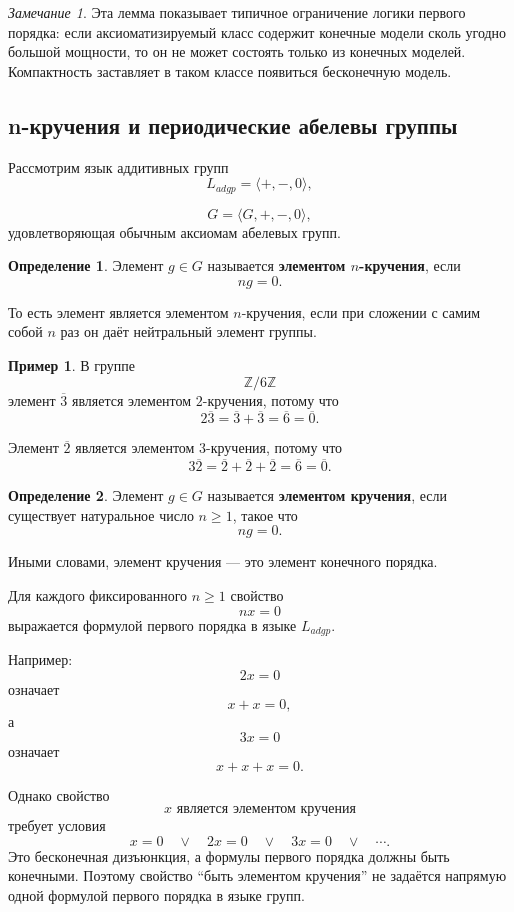 \documentclass[12pt,a4paper,oneside,openany]{book}
\theoremstyle{definition}
\newtheorem{definition}{Определение}[chapter]
\newtheorem{example}{Пример}[chapter]
\theoremstyle{plain}
\theoremstyle{remark}
\newtheorem{remark}{Замечание}[chapter]
\begin{document}
\begin{remark}
Эта лемма показывает типичное ограничение логики первого порядка: если аксиоматизируемый класс содержит конечные модели сколь угодно большой мощности, то он не может состоять только из конечных моделей. Компактность заставляет в таком классе появиться бесконечную модель.
\end{remark}

\subsection{n-кручения и периодические абелевы группы}

Рассмотрим язык аддитивных групп
\[
L_{adgp}
=
\langle +,-,0\rangle,
\]

\[
G=\langle G,+,-,0\rangle,
\]
удовлетворяющая обычным аксиомам абелевых групп.

\begin{definition}
Элемент \(g\in G\) называется \textbf{элементом \(n\)-кручения}, если
\[
ng=0.
\]
\end{definition}

То есть элемент является элементом \(n\)-кручения, если при сложении с самим собой \(n\) раз он даёт нейтральный элемент группы.

\begin{example}
В группе
\[
\mathbb Z/6\mathbb Z
\]
элемент \(\overline{3}\) является элементом \(2\)-кручения, потому что
\[
2\overline{3}
=
\overline{3}+\overline{3}
=
\overline{6}
=
\overline{0}.
\]

Элемент \(\overline{2}\) является элементом \(3\)-кручения, потому что
\[
3\overline{2}
=
\overline{2}+\overline{2}+\overline{2}
=
\overline{6}
=
\overline{0}.
\]
\end{example}

\begin{definition}
Элемент \(g\in G\) называется \textbf{элементом кручения}, если существует натуральное число \(n\ge 1\), такое что
\[
ng=0.
\]
\end{definition}

Иными словами, элемент кручения — это элемент конечного порядка.

Для каждого фиксированного \(n\ge 1\) свойство
\[
nx=0
\]
выражается формулой первого порядка в языке \(L_{adgp}\).

Например:
\[
2x=0
\]
означает
\[
x+x=0,
\]
а
\[
3x=0
\]
означает
\[
x+x+x=0.
\]

Однако свойство
\[
x \text{ является элементом кручения}
\]
требует условия
\[
x=0
\quad\vee\quad
2x=0
\quad\vee\quad
3x=0
\quad\vee\quad
\cdots.
\]
Это бесконечная дизъюнкция, а формулы первого порядка должны быть конечными. Поэтому свойство ``быть элементом кручения'' не задаётся напрямую одной формулой первого порядка в языке групп.
\end{document}
